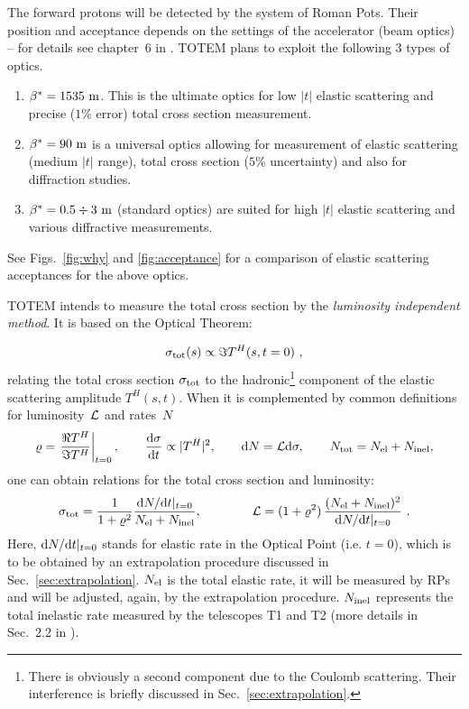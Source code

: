 \documentclass{desyproc}
\def\rh{\varrho}
\def\be{\beta}
\def\si{\sigma}
\def\un#1{\ {\rm #1}}
\def\d{{\rm d}}
\begin{document}
The forward protons will be detected by the system of Roman Pots. Their position and acceptance depends on the settings of the accelerator (beam optics) -- for details see chapter~6 in \cite{jinst}. TOTEM plans to exploit the following 3 types of optics.

\begin{enumerate}
\item {\em $\be^* = 1535\un{m}$}. This is the ultimate optics for low $|t|$ elastic scattering and precise ($1\%$ error) total cross section measurement.
\item {\em $\be^* = 90\un{m}$} is a universal optics allowing for measurement of elastic scattering (medium $|t|$ range), total cross section ($5\%$ uncertainty) and also for diffraction studies.
\item {\em $\be^* = 0.5 \div 3\un{m}$} (standard optics) are suited for high $|t|$ elastic scattering and various diffractive measurements.
\end{enumerate}

See Figs.~\ref{fig:why} and \ref{fig:acceptance} for a comparison of elastic scattering acceptances for the above optics.

TOTEM intends to measure the total cross section by the {\em luminosity independent method}. It is based on the Optical Theorem:

\begin{equation}
\si_{\rm tot}(s) \propto \Im T^H(s, t = 0) \ ,
\end{equation}
%
relating the total cross section $\si_{\rm tot}$ to the hadronic\footnote{
There is obviously a second component due to the Coulomb scattering. Their interference is briefly discussed in Sec.~\ref{sec:extrapolation}.
} component of the elastic scattering amplitude $T^H(s, t)$. When it is complemented by common definitions for luminosity~$\cal L$ and rates~$N$
%
\begin{equation}\label{eq:def}
\rh = \left. \Re T^H\over\Im T^H \right|_{t=0}, \qquad {\d\si\over\d t} \propto |T^H|^2,\qquad \d N = {\cal L} \d\si,\qquad N_{\rm tot} = N_{\rm el} + N_{\rm inel},
\end{equation}
%
one can obtain relations for the total cross section and luminosity:
%
\begin{equation}\label{eq:lim}
\si_{\rm tot} = {1\over 1+\rh^2} {{\d N/ \d t|_{t=0}}\over N_{\rm el} + N_{\rm inel}}, \qquad\qquad {\cal L} = (1+\rh^2)\, {(N_{\rm el} + N_{\rm inel})^2\over {\d N/ \d t|_{t=0}}}\ .
\end{equation}
%
Here, $\d N/\d t|_{t=0}$ stands for elastic rate in the Optical Point (i.e. $t = 0$), which is to be obtained by an extrapolation procedure discussed in Sec.~\ref{sec:extrapolation}. $N_{\rm el}$ is the total elastic rate, it will be measured by RPs and will be adjusted, again, by the extrapolation procedure. $N_{\rm inel}$ represents the total inelastic rate measured by the telescopes T1 and T2 (more details in Sec.~2.2 in \cite{mario}).
\end{document}
